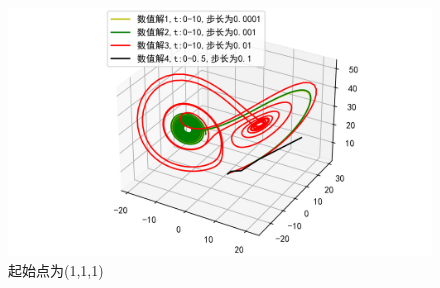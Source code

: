 \documentclass[a4paper]{article}%
\begin{document}
\begin{figure}[H]
    \centering
    \includegraphics[scale=0.7]{15}
    \caption{起始点为(1,1,1)}
\end{figure}
\end{document}
